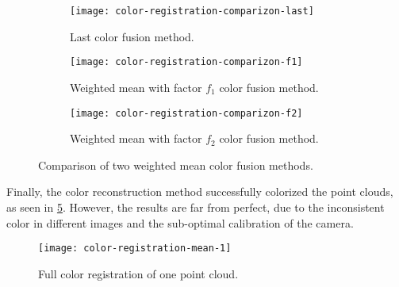 \begin{figure}[h]
    
    \centering
    \begin{subfigure}[t]{\textwidth}
        \centering
        \texttt{[image: color-registration-comparizon-last]}

        \caption{Last color fusion method.}
        \label{figure:fusion-methods-mean}
    \end{subfigure}

    \begin{subfigure}[t]{\textwidth}
        \centering
        \texttt{[image: color-registration-comparizon-f1]}

        \caption{Weighted mean with factor $f_1$ color fusion method.}
        \label{figure:fusion-methods-f1}
    \end{subfigure}%

    \begin{subfigure}[t]{\textwidth}
        \centering
        \texttt{[image: color-registration-comparizon-f2]}

        \caption{Weighted mean with factor $f_2$ color fusion method.}
        \label{figure:fusion-methods-f2}
    \end{subfigure}

    \caption{Comparison of two weighted mean color fusion methods.}
    \label{figure:fusion-methods-2}

\end{figure}

Finally, the color reconstruction method successfully colorized the point clouds, as seen in \cref{figure:full-color-registration}. However, the results are far from perfect, due to the inconsistent color in different images and the sub-optimal calibration of the camera.

\begin{figure}[h]
    
    \centering
    \texttt{[image: color-registration-mean-1]}

    \caption{Full color registration of one point cloud.}
    \label{figure:full-color-registration}
\end{figure}